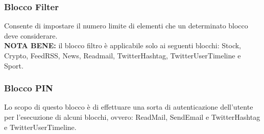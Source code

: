 \subsubsection{Blocco Filter}
Consente di impostare il numero limite di elementi che un determinato blocco deve considerare. \\
\textbf{NOTA BENE:} il blocco filtro è applicabile solo ai seguenti blocchi: Stock, Crypto, FeedRSS, News, Readmail, TwitterHashtag, TwitterUserTimeline e Sport.

\subsubsection{Blocco PIN}
Lo scopo di questo blocco è di effettuare una sorta di autenticazione dell'utente per l'esecuzione di alcuni blocchi, ovvero: ReadMail, SendEmail e TwitterHashtag e TwitterUserTimeline.
